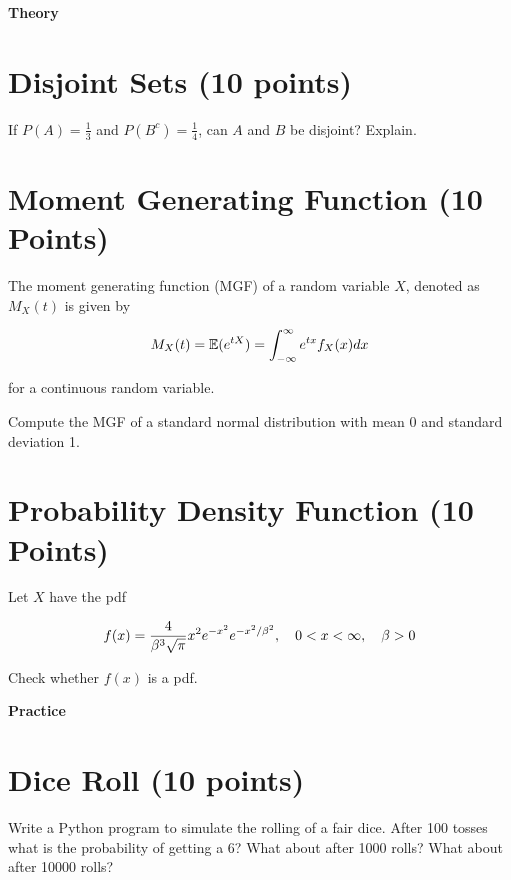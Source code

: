 \documentclass[12pt, xcolor=dvipsnames,svgnames,x11names]{article}
\makeatletter
\newenvironment{multiequation}[1][]{%
\begin{equation}%
   \begin{aligned}%
   \ifx#1\@empty\else\label{#1}\fi%
}{%
   \end{aligned}%
\end{equation}%
}
\makeatother
\begin{document}


{{\LARGE \textbf{Theory}}}

 \section{Disjoint Sets (10 points)}
    If $P(A) = \tfrac{1}{3}$ and $P(B^c) = \frac{1}{4}$, can $A$ and $B$ be disjoint? Explain.



\section{Moment Generating Function (10 Points)}

The moment generating function (MGF) of a random variable $X$, denoted as $M_X(t)$ is given by 

\begin{multiequation}
M_X(t) = \Ebb(e^{tX}) = \int_{-\infty}^\infty e^{tx}f_X(x)dx
\end{multiequation}

for a continuous random variable.

Compute the MGF of a standard normal distribution with mean 0 and standard deviation 1.


\section{Probability Density Function (10 Points)}

Let $X$ have the pdf 

\begin{multiequation}
f(x) = \frac{4}{\beta^3 \sqrt{\pi}} x^2 e^{-x^2} e^{-x^2/\beta^2}, \quad 0  < x < \infty, \quad \beta > 0
\end{multiequation}

Check whether $f(x)$ is a pdf.

\bigskip

\bigskip

{{\LARGE \textbf{Practice}}}

    \section{Dice Roll (10 points)}
    

Write a Python program to simulate the rolling of a  fair dice. After 100 tosses what is the probability of getting a 6? What about after 1000 rolls? What about after 10000 rolls?
\end{document}

